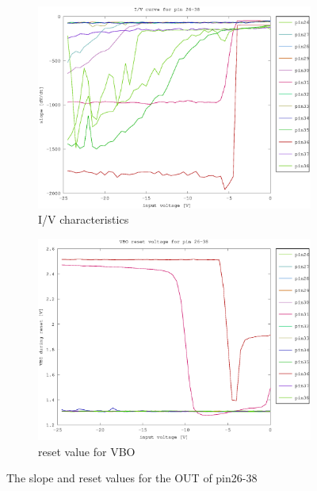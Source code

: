 \begin{figure}[h]
	\centering
	\begin{subfigure}[b]{0.475\textwidth}
	    \centering
	    \includegraphics[width=\textwidth]{fig/pin26-38_slope_-25-0V.eps}
	    \caption[Network2]%
	    {I/V characteristics}    
	    \label{fig:pin26-40_slope}
	\end{subfigure}
	\hfill
	\begin{subfigure}[b]{0.475\textwidth}  
	    \centering 
	    \includegraphics[width=\textwidth]{fig/pin26-38_reset_-25-0V.eps}
	    \caption[]%
	    {reset value for VBO}    
	    \label{fig:pin26-40_reset}
	\end{subfigure}
	\caption{The slope and reset values for the OUT of pin26-38}
	\label{fig:pin32}
\end{figure}



